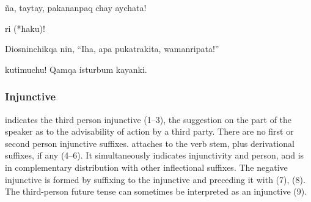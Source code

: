%
{\textexclamdown{}\~na, taytay, pakananpaq chay aychata!}%
{}%
{}{}%

%
{\textexclamdown{} ri (*haku)!}%
{}%
{}{}%

%
{Diosninchikqa nin, ``\textexclamdown{}Iha, apa pukatrakita, wamanripata!''}%
{}%
{}{}%

%
{\textexclamdown{} kutimuchu! Qamqa isturbum kayanki.}%
{}%
{}{}%

\subsubsection{Injunctive }
 indicates the third person injunctive (1--3), the suggestion on the part of the speaker as to the advisability of action by a third party. There are no first or second person injunctive suffixes.  attaches to the verb stem, plus derivational suffixes, if any (4--6). It simultaneously indicates injunctivity and person, and is in complementary distribution with other inflectional suffixes. The negative injunctive is formed by suffixing  to the injunctive and preceding it with  (7), (8). The third-person future tense can sometimes be interpreted as an injunctive (9).

